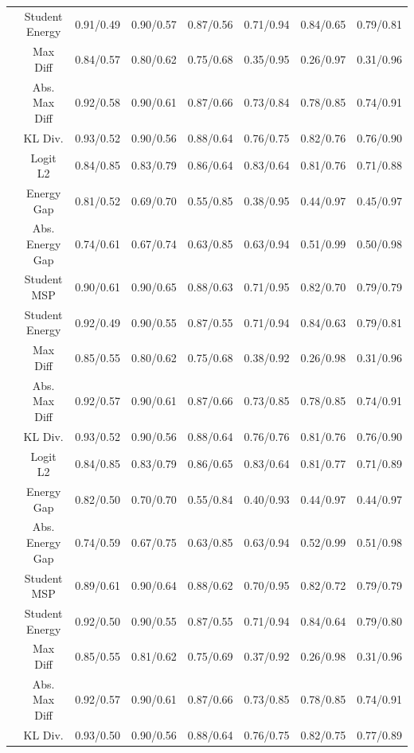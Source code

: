 \documentclass[border=2pt]{standalone}
\begin{document}
\begin{tabular}{cccccccc}
 & Student Energy & 0.91/0.49 & 0.90/0.57 & 0.87/0.56 & 0.71/0.94 & 0.84/0.65 & 0.79/0.81 \\
\addlinespace
100 & Max Diff & 0.84/0.57 & 0.80/0.62 & 0.75/0.68 & 0.35/0.95 & 0.26/0.97 & 0.31/0.96 \\
 & Abs. Max Diff & 0.92/0.58 & 0.90/0.61 & 0.87/0.66 & 0.73/0.84 & 0.78/0.85 & 0.74/0.91 \\
 & KL Div. & 0.93/0.52 & 0.90/0.56 & 0.88/0.64 & 0.76/0.75 & 0.82/0.76 & 0.76/0.90 \\
 & Logit L2 & 0.84/0.85 & 0.83/0.79 & 0.86/0.64 & 0.83/0.64 & 0.81/0.76 & 0.71/0.88 \\
 & Energy Gap & 0.81/0.52 & 0.69/0.70 & 0.55/0.85 & 0.38/0.95 & 0.44/0.97 & 0.45/0.97 \\
 & Abs. Energy Gap & 0.74/0.61 & 0.67/0.74 & 0.63/0.85 & 0.63/0.94 & 0.51/0.99 & 0.50/0.98 \\
 & Student MSP & 0.90/0.61 & 0.90/0.65 & 0.88/0.63 & 0.71/0.95 & 0.82/0.70 & 0.79/0.79 \\
 & Student Energy & 0.92/0.49 & 0.90/0.55 & 0.87/0.55 & 0.71/0.94 & 0.84/0.63 & 0.79/0.81 \\
\addlinespace
200 & Max Diff & 0.85/0.55 & 0.80/0.62 & 0.75/0.68 & 0.38/0.92 & 0.26/0.98 & 0.31/0.96 \\
 & Abs. Max Diff & 0.92/0.57 & 0.90/0.61 & 0.87/0.66 & 0.73/0.85 & 0.78/0.85 & 0.74/0.91 \\
 & KL Div. & 0.93/0.52 & 0.90/0.56 & 0.88/0.64 & 0.76/0.76 & 0.81/0.76 & 0.76/0.90 \\
 & Logit L2 & 0.84/0.85 & 0.83/0.79 & 0.86/0.65 & 0.83/0.64 & 0.81/0.77 & 0.71/0.89 \\
 & Energy Gap & 0.82/0.50 & 0.70/0.70 & 0.55/0.84 & 0.40/0.93 & 0.44/0.97 & 0.44/0.97 \\
 & Abs. Energy Gap & 0.74/0.59 & 0.67/0.75 & 0.63/0.85 & 0.63/0.94 & 0.52/0.99 & 0.51/0.98 \\
 & Student MSP & 0.89/0.61 & 0.90/0.64 & 0.88/0.62 & 0.70/0.95 & 0.82/0.72 & 0.79/0.79 \\
 & Student Energy & 0.92/0.50 & 0.90/0.55 & 0.87/0.55 & 0.71/0.94 & 0.84/0.64 & 0.79/0.80 \\
\addlinespace
300 & Max Diff & 0.85/0.55 & 0.81/0.62 & 0.75/0.69 & 0.37/0.92 & 0.26/0.98 & 0.31/0.96 \\
 & Abs. Max Diff & 0.92/0.57 & 0.90/0.61 & 0.87/0.66 & 0.73/0.85 & 0.78/0.85 & 0.74/0.91 \\
 & KL Div. & 0.93/0.50 & 0.90/0.56 & 0.88/0.64 & 0.76/0.75 & 0.82/0.75 & 0.77/0.89 \\

\end{tabular}
\end{document}

